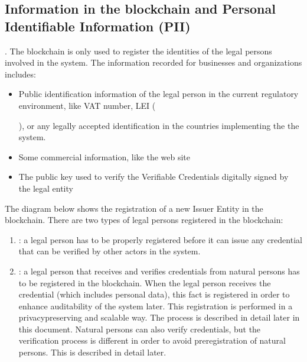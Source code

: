 \documentclass[a4paper,12pt,english,openany]{sphinxmanual}
\begin{document}
\subsection{Information in the blockchain and Personal Identifiable Information (PII)}
\label{\detokenize{privacycred:information-in-the-blockchain-and-personal-identifiable-information-pii}}
\sphinxAtStartPar
{}. The blockchain is only used  to register the identities of the legal persons involved in the system. The information recorded for businesses and organizations includes:
\begin{itemize}
\item {} 
\sphinxAtStartPar
Public identification information of the legal person in the current regulatory environment, like VAT number, LEI (%
\begin{footnote}[2]\sphinxAtStartFootnote
{}
%
\end{footnote}), or any legally accepted identification in the countries implementing the the system.

\item {} 
\sphinxAtStartPar
Some commercial information, like the web site

\item {} 
\sphinxAtStartPar
The public key used to verify the Verifiable Credentials digitally signed by the legal entity

\end{itemize}

\sphinxAtStartPar
The diagram below shows the registration of a new Issuer Entity in the blockchain. There are two types of legal persons registered in the blockchain:
\begin{enumerate}
%
\item {} 
\sphinxAtStartPar
{}: a legal person has to be properly registered before it can issue any credential that can be verified by other actors in the system.

\item {} 
\sphinxAtStartPar
{}: a legal person that receives and verifies credentials from natural persons has to be registered in the blockchain. When the legal person receives the credential (which includes personal data), this fact is registered in order to enhance auditability of the system later. This registration is performed in a privacy\sphinxhyphen{}preserving and scalable way. The process is described in detail later in this document. Natural persons can also verify credentials, but the verification process is different in order to avoid pre\sphinxhyphen{}registration of natural persons. This is described in detail later.

\end{enumerate}
\end{document}

